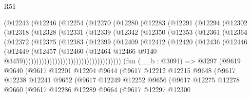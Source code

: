 \begin{lexlean}{R51}
\begin{coremodule}
                (@12243
                  (@12246
                    (@12254
                      (@12270
                        (@12280
                          (@12283
                            (@12291
                              (@12294
                                (@12302
                                  (@12318
                                    (@12328
                                      (@12331
                                        (@12339
                                          (@12342
                                            (@12350
                                              (@12353
                                                (@12361
                                                  (@12364
                                                    (@12372
                                                      (@12375
                                                        (@12383
                                                          (@12399
                                                            (@12409
                                                              (@12412
                                                                (@12420
                                                                  (@12436
                                                                    (@12446
                                                                      (@12449
                                                                        (@12457
                                                                          (@12460
                                                                            (@12464
                                                                              @12466
                                                                              @9140
                                                                              @3459)))))))))))))))))))))))))))))))))))))
    (fun (__b : @3091) =>
    @3297
      (@9619
        @9640
        (@9617
          @12201
          @12204
          @9644
          (@9617
            @12212
            @12215
            @9648
            (@9617
              @12238
              @12241
              @9652
              (@9617
                @12249
                @12252
                @9656
                (@9617
                  @12275
                  @12278
                  @9660
                  (@9617
                    @12286
                    @12289
                    @9664
                    (@9617
                      @12297
                      @12300

\end{coremodule}
\end{lexlean}
